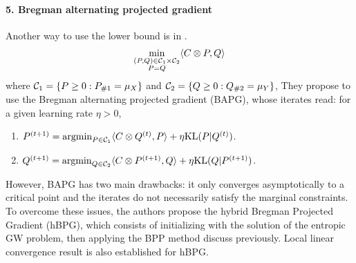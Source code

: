 \paragraph{5. Bregman alternating projected gradient}
Another way to use the lower bound is in \citep{Li22}.
\begin{align}
  \min_{\substack{(P, Q) \in \mathcal C_1 \times \mathcal C_2 \\ P = Q}} \langle C \otimes P, Q \rangle
\end{align}
where $\mathcal C_1 = \{ P \geq 0: P_{\# 1} = \mu_X \}$ and $\mathcal C_2 = \{ Q \geq 0: Q_{\# 2} = \mu_Y \}$,
They propose to use the Bregman alternating projected gradient (BAPG), whose iterates read:
for a given learning rate $\eta > 0$,
\begin{enumerate}
  \item $P^{(t+1)} = \operatorname*{argmin}_{P \in \mathcal C_1} \langle C \otimes Q^{(t)}, P \rangle + \eta \text{KL}(P | Q^{(t)})$.
  \item $Q^{(t+1)} = \operatorname*{argmin}_{Q \in \mathcal C_2} \langle C \otimes P^{(t+1)}, Q \rangle + \eta \text{KL}(Q | P^{(t+1)})$.
\end{enumerate}
However, BAPG has two main drawbacks: it only converges asymptotically to a critical point and
the iterates do not necessarily satisfy the marginal constraints. To overcome these issues,
the authors propose the hybrid Bregman Projected Gradient (hBPG),
which consists of initializing with the solution of the entropic GW problem,
then applying the BPP method discuss previously. Local linear convergence result
is also established for hBPG.

